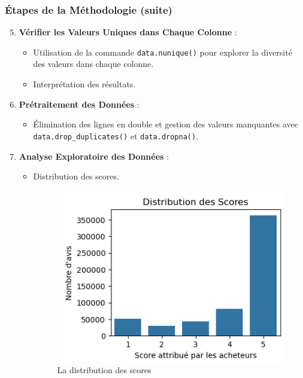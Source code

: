 \begin{frame}
    \frametitle{Étapes de la Méthodologie (suite)}

    \begin{enumerate}
        \setcounter{enumi}{4}
        \item \textbf{Vérifier les Valeurs Uniques dans Chaque Colonne} :
            \begin{itemize}
                \item Utilisation de la commande \texttt{data.nunique()} pour explorer la diversité des valeurs dans chaque colonne.
                \item Interprétation des résultats.
            \end{itemize}
        \item \textbf{Prétraitement des Données} :
            \begin{itemize}
                \item Élimination des lignes en double et gestion des valeurs manquantes avec \texttt{data.drop\_duplicates()} et \texttt{data.dropna()}.
            \end{itemize}
    \end{enumerate}
\end{frame}

\begin{frame}
    \begin{enumerate}
        \setcounter{enumi}{6}
        \item \textbf{Analyse Exploratoire des Données} :
            \begin{itemize}
                \item Distribution des scores.
                \begin{figure}[h]
                    \centering
                    \includegraphics[width=0.7\linewidth]{Figures/distrubutiondesscores.PNG}
                    \captionsetup{font=scriptsize}
                    \caption{La distribution des scores}
                    \label{fig:distribution_des_scores}
                \end{figure}
            \end{itemize}
    \end{enumerate}
\end{frame}

